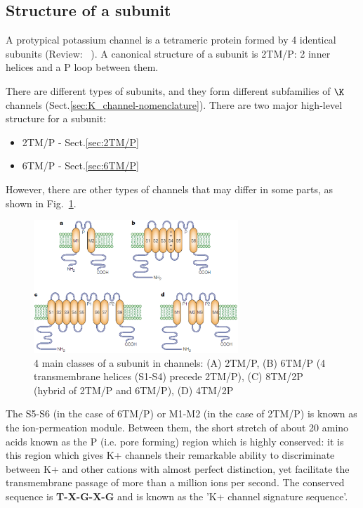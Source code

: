 \subsection{Structure of a subunit}
\label{sec:structure-K-channel}

A protypical potassium channel is a tetrameric protein formed by 4 identical
subunits (Review: ~\citep{choe2002pcs}).
A canonical structure of a subunit is 2TM/P: 2 inner helices and a P loop
between them.

There are different types of subunits, and they form different
subfamilies of $\K$ channels (Sect.\ref{sec:K_channel-nomenclature}).
There are two major high-level structure for a subunit:
\begin{itemize}
  \item 2TM/P - Sect.\ref{sec:2TM/P}
  \item 6TM/P - Sect.\ref{sec:6TM/P}
\end{itemize}
However, there are other types of  channels that may differ in some
parts, as shown in Fig.~\ref{fig:K_channel2}. 

\begin{figure}[hbt]
  \centerline{\includegraphics[height=5cm,
    angle=0]{./images/K_channels2.eps}}
\caption{4 main classes of a subunit in  channels: (A) 2TM/P, (B) 6TM/P
(4 transmembrane helices (S1-S4) precede 2TM/P), (C)
 8TM/2P (hybrid of 2TM/P and 6TM/P), (D) 4TM/2P}
\label{fig:K_channel2}
\end{figure}

The S5-S6 (in the case of 6TM/P) or M1-M2 (in the case of 2TM/P) is known as the
ion-permeation module. Between them, the  short stretch of about 20 amino acids
known as the P (i.e. pore forming) region which is highly conserved: it is this
region which gives K+ channels their remarkable ability to discriminate between
K+ and other cations with almost perfect distinction, yet facilitate the
transmembrane passage of more than a million ions per second. The conserved
sequence is {\bf T-X-G-X-G} and is known as the 'K+ channel signature sequence'.

